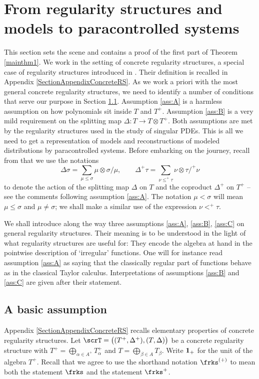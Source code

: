 \section{From regularity structures and models to paracontrolled systems}
\label{SectionRStoPC}

This section sets the scene and contains a proof of the first part of Theorem \ref{mainthm1}. We work in the setting of concrete regularity structures, a special case of regularity structures introduced in \cite{BH}. Their definition is recalled in Appendix \ref{SectionAppendixConcreteRS}. As we work a priori with the most general concrete regularity structures, we need to identify a number of conditions that serve our purpose in Section \ref{SubsectionBasicAssump}. Assumption \eqref{ass:A} is a harmless assumption on how polynomials sit inside $T$ and $T^+$. Assumption \eqref{ass:B} is a very mild requirement on the splitting map $\Delta : T\to T\otimes T^+$. Both assumptions are met by the regularity structures used in the study of singular PDEs. This is all we need to get a representation of models and reconstructions of modeled distributions by paracontrolled systems. Before embarking on the journey, recall from \cite{BH} that we use the notations
\[
\Delta\sigma = \sum_{\mu\leq\sigma} \mu\otimes\sigma/\mu, \qquad \Delta^+\tau = \sum_{\nu\leq^+\tau} \nu\otimes\tau/^+\nu
\]
to denote the action of the splitting map $\Delta$ on $T$ and the coproduct $\Delta^+$ on $T^+$ -- see the comments following assumption \eqref{ass:A}. The notation $\mu<\sigma$ will mean $\mu\leq \sigma$ and $\mu\neq\sigma$; we shall make a similar use of the expression $\nu<^+\tau$.

We shall introduce along the way three assumptions \eqref{ass:A}, \eqref{ass:B}, \eqref{ass:C} on general regularity structures. Their meaning is to be understood in the light of what regularity structures are useful for: They encode the algebra at hand in the pointwise description of `irregular' functions. One will for instance read assumption \eqref{ass:A} as saying that the classically regular part of functions behave as in the classical Taylor calculus. Interpretations of assumptions \eqref{ass:B} and \eqref{ass:C} are given after their statement.

\subsection{A basic assumption}
\label{SubsectionBasicAssump}

Appendix \ref{SectionAppendixConcreteRS} recalls elementary properties of concrete regularity structures. Let $\scrT=\bigl((T^+,\Delta^+),(T,\Delta)\bigr)$ be a concrete regularity structure with $T^+ = \bigoplus_{\alpha\in A^+}T_\alpha^+$ and $T=\bigoplus_{\beta\in A} T_\beta$. Write ${\bf 1}_+$ for the unit of the algebra $T^+$. Recall that we agree to use the shorthand notation $\frks^{(+)}$ to mean both the statement $\frks$ and the statement $\frks^+$.

